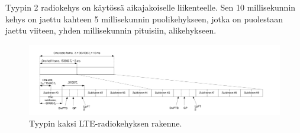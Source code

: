 \documentclass[finnish,12pt,a4paper,pdftex]{article}
\begin{document}
Tyypin 2 radiokehys on käytössä aikajakoiselle liikenteelle. Sen 10 millisekunnin kehys on jaettu kahteen 5 millisekunnin puolikehykseen, jotka on puolestaan jaettu viiteen, yhden millisekunnin pituisiin, alikehykseen. \cite{ETSIts36211}
~\begin{figure}[h!]
    \centering
    \includegraphics[width=\linewidth]{Images/radioframe2.png}
    \caption{Tyypin kaksi LTE-radiokehyksen rakenne. \cite{ETSIts36211}}
    \label{fig:type2}
\end{figure}
\end{document}
